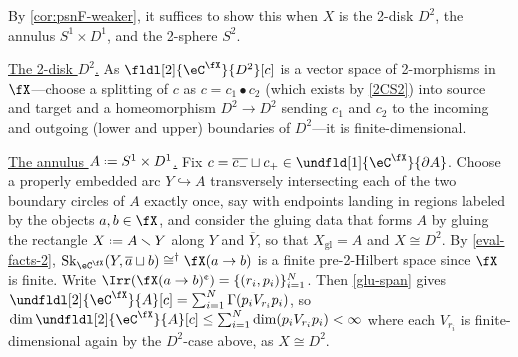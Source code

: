 \documentclass[12pt,reqno]{amsart}
\newcommand{\glu}{\mathrm{gl}}
\newcommand{\Sk}{\mathrm{Sk}}
\newcommand{\C}{\eC}
\newcommand{\blt}{\bullet}
\newcommand{\fcj}[1]{\overline{#1}}
\newcommand{\orev}{\overline}
\newcommand{\cent}{\textup{\textcent}}
\newcommand{\itemstep}[1]{\smallskip\noindent\underline{#1}}
\renewcommand{\setminus}{\smallsetminus}
\renewcommand{\amalg}{\sqcup}
\DeclareRobustCommand{\coloneq}{\mathrel{\vcenter{\baselineskip0.5ex\lineskiplimit0pt\hbox{\scriptsize{\upshape.}}\hbox{\scriptsize{\upshape.}}}}=}
\begin{document}
\begin{pf}
By \cref{cor:psnF-weaker}, it suffices to show this when $X$ is the 2-disk $D^2$, the annulus $S^1\times D^1$, and the 2-sphere $S^2$.

\itemstep{The 2-disk $D^2$.}
As $\fldl[2]{\C^\fX}{D^2}[c]$ is a vector space of 2-morphisms in $\fX$---choose a splitting of $c$ as $c=c_1\blt c_2$ (which exists by \ref{2CS2}) into source and target and a homeomorphism $D^2\to D^2$ sending $c_1$ and $c_2$ to the incoming and outgoing (lower and upper) boundaries of $D^2$---it is finite-dimensional.

\itemstep{The annulus $A\coloneq S^1\times D^1$.} 
Fix $c = \fcj{c_-}\amalg c_+\in\undfld[1]{\C^\fX}{\partial A}$. Choose a properly embedded arc $Y\hookrightarrow A$ transversely intersecting each of the two boundary circles of $A$ exactly once, say with endpoints landing in regions labeled by the objects $a,b\in\fX$, and consider the gluing data that forms $A$ by gluing the rectangle $X\coloneq A\setminus Y$ along $Y$ and $\orev{Y}$, so that $X_\glu=A$ and $X\cong D^2$. By \cref{eval-facts-2}, $\Sk_{\C^\fX}(Y,\fcj a\amalg b)\cong^\dag\fX(a\to b)$ is a finite pre-2-Hilbert space since $\fX$ is finite. Write $\Irr(\fX(a\to b)^\cent)=\{(r_i,p_i)\}_{i=1}^N$. Then \cref{glu-span} gives $\undfldl[2]{\C^\fX}{A}[c]=\sum_{i=1}^N\Gamma(p_iV_{r_i}p_i)$, so $\dim\undfldl[2]{\C^\fX}{A}[c]\leq\sum_{i=1}^N\dim (p_iV_{r_i}p_i)<\infty$ where each $V_{r_i}$ is finite-dimensional again by the $D^2$-case above, as $X\cong D^2$.


\end{pf}
\end{document}
